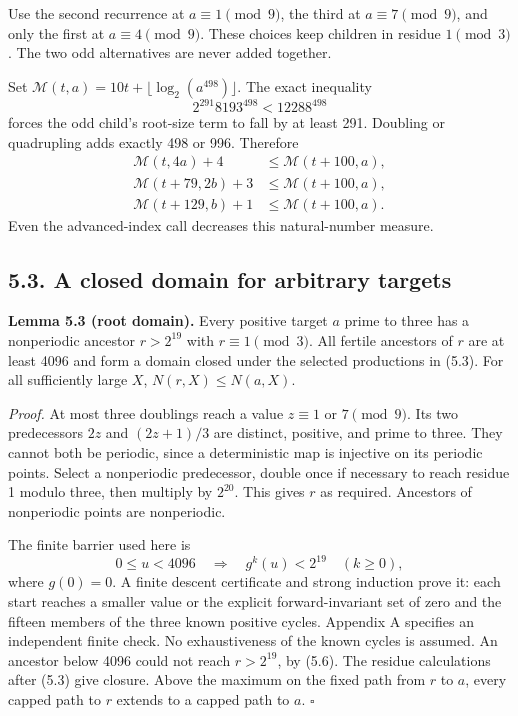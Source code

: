 \documentclass[11pt,a4paper]{article}
\begin{document}
Use the second recurrence at \(a\equiv1\pmod9\), the third at
\(a\equiv7\pmod9\), and only the first at \(a\equiv4\pmod9\). These
choices keep children in residue \(1\pmod3\). The two odd alternatives
are never added together.

Set \(\mathcal M(t,a)=10t+\lfloor\log_2(a^{498})\rfloor\). The exact
inequality \[
2^{291}8193^{498}<12288^{498}
\tag{5.4}
\] forces the odd child's root-size term to fall by at least 291.
Doubling or quadrupling adds exactly 498 or 996. Therefore \[
\begin{aligned}
\mathcal M(t,4a)+4&\le\mathcal M(t+100,a),\\
\mathcal M(t+79,2b)+3&\le\mathcal M(t+100,a),\\
\mathcal M(t+129,b)+1&\le\mathcal M(t+100,a).
\end{aligned}
\tag{5.5}
\] Even the advanced-index call decreases this natural-number measure.

\subsection{5.3. A closed domain for arbitrary
targets}\label{a-closed-domain-for-arbitrary-targets}

\textbf{Lemma 5.3 (root domain).} Every positive target \(a\) prime to
three has a nonperiodic ancestor \(r>2^{19}\) with \(r\equiv1\pmod3\).
All fertile ancestors of \(r\) are at least 4096 and form a domain
closed under the selected productions in (5.3). For all sufficiently
large \(X\), \(N(r,X)\le N(a,X)\).

\emph{Proof.} At most three doublings reach a value \(z\equiv1\) or
\(7\pmod9\). Its two predecessors \(2z\) and \((2z+1)/3\) are distinct,
positive, and prime to three. They cannot both be periodic, since a
deterministic map is injective on its periodic points. Select a
nonperiodic predecessor, double once if necessary to reach residue 1
modulo three, then multiply by \(2^{20}\). This gives \(r\) as required.
Ancestors of nonperiodic points are nonperiodic.

The finite barrier used here is \[
0\le u<4096\quad\Longrightarrow\quad
g^k(u)<2^{19}\quad(k\ge0),
\tag{5.6}
\] where \(g(0)=0\). A finite descent certificate and strong induction
prove it: each start reaches a smaller value or the explicit
forward-invariant set of zero and the fifteen members of the three known
positive cycles. Appendix A specifies an independent finite check. No
exhaustiveness of the known cycles is assumed. An ancestor below 4096
could not reach \(r>2^{19}\), by (5.6). The residue calculations after
(5.3) give closure. Above the maximum on the fixed path from \(r\) to
\(a\), every capped path to \(r\) extends to a capped path to \(a\).
\(\square\)
\end{document}
